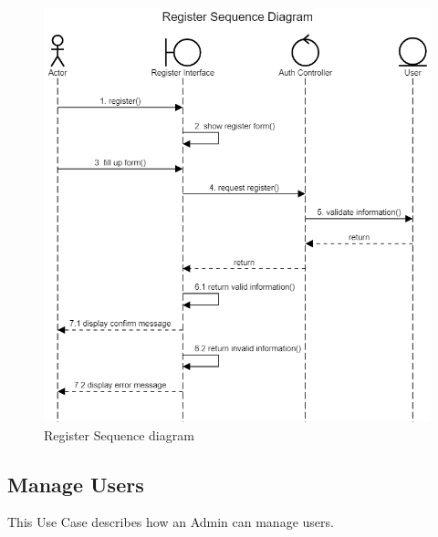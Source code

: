 \begin{figure}[H]
    \centering
    \includegraphics[width=1.0\textwidth]{images/RegisterSequence.png}
    \caption{Register Sequence diagram}
    \label{fig:RegisterSeq}
\end{figure}

\subsection{Manage Users}
This Use Case describes how an Admin can manage users.

